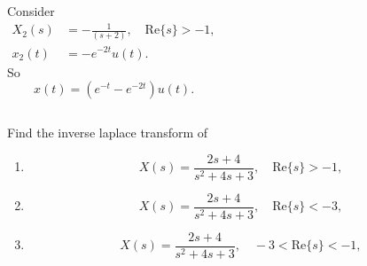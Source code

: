 \begin{frame}[t]{}
    {
            \begin{columns}
                    
                    Consider
                    \begin{align*}
                        X_2(s) &= -\frac{1}{(s+2)}, \quad \mathrm{Re}\{s\} > -1,\\
                        x_2(t) &= -e^{-2t}u(t).
                    \end{align*}
                    So
                    \begin{equation*}
                        x(t) = (e^{-t} -e^{-2t})u(t).
                    \end{equation*}
            \end{columns}

    }
\end{frame}



\begin{frame}[t]{}
    \begin{example}
        Find the inverse laplace transform of
        \begin{enumerate}
            \item
            \begin{equation*}
                X(s) = \frac{2s+4}{s^2 + 4s+ 3}, \quad \mathrm{Re}\{s\} > -1,
            \end{equation*}
            \item
            \begin{equation*}
                X(s) = \frac{2s+4}{s^2 + 4s+ 3}, \quad \mathrm{Re}\{s\} < -3,
            \end{equation*}
            \item
            \begin{equation*}
                X(s) = \frac{2s+4}{s^2 + 4s+ 3}, \quad -3 < \mathrm{Re}\{s\} < -1,
            \end{equation*}
        \end{enumerate}
    \end{example}
\end{frame}


